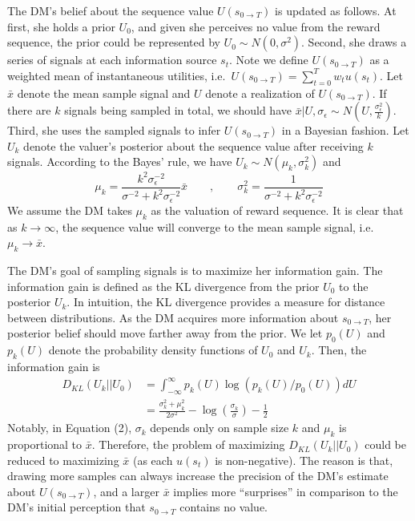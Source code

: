 \documentclass[
  12pt,
]{article}
\begin{document}
The DM's belief about the sequence value \(U(s_{0\rightarrow T})\) is
updated as follows. At first, she holds a prior \(U_0\), and given she
perceives no value from the reward sequence, the prior could be
represented by \(U_0 \sim N(0, \sigma^2)\). Second, she draws a series
of signals at each information source \(s_t\). Note we define
\(U(s_{0\rightarrow T})\) as a weighted mean of instantaneous utilities,
i.e.~\(U(s_{0\rightarrow T})=\sum_{t=0}^Tw_tu(s_t)\). Let \(\bar{x}\)
denote the mean sample signal and \(U\) denote a realization of
\(U(s_{0\rightarrow T})\). If there are \(k\) signals being sampled in
total, we should have
\(\bar{x} | U, \sigma_\epsilon\sim N(U,\frac{\sigma_{\epsilon}^2}{k})\).
Third, she uses the sampled signals to infer \(U(s_{0\rightarrow T})\)
in a Bayesian fashion. Let \(U_k\) denote the valuer's posterior about
the sequence value after receiving \(k\) signals. According to the
Bayes' rule, we have \(U_k\sim N(\mu_k,\sigma_k^2)\) and\[
\mu_k = \frac{k^2\sigma_\epsilon^{-2}}{\sigma^{-2}+k^2\sigma_\epsilon^{-2}}\bar{x}\qquad,\qquad 
\sigma_k^2 =  \frac{1}{\sigma^{-2}+k^2\sigma_\epsilon^{-2}}
\]We assume the DM takes \(\mu_k\) as the valuation of reward sequence.
It is clear that as \(k\rightarrow \infty\), the sequence value will
converge to the mean sample signal, i.e.~\(\mu_k \rightarrow \bar{x}\).

The DM's goal of sampling signals is to maximize her information gain.
The information gain is defined as the KL divergence from the prior
\(U_0\) to the posterior \(U_k\). In intuition, the KL divergence
provides a measure for distance between distributions. As the DM
acquires more information about \(s_{0\rightarrow T}\), her posterior
belief should move farther away from the prior. We let \(p_0(U)\) and
\(p_k(U)\) denote the probability density functions of \(U_0\) and
\(U_k\). Then, the information gain is\[\tag{2}
\begin{aligned}
D_{KL}(U_k||U_0)&=\int_{-\infty}^{\infty} p_k(U) \log\left(p_k(U)/p_0(U)\right)dU \\
&=\frac{\sigma_k^2+\mu_k^2}{2\sigma^2} - \log\left(\frac{\sigma_k}{\sigma}\right)-\frac{1}{2}
\end{aligned}
\]Notably, in Equation (2), \(\sigma_k\) depends only on sample size
\(k\) and \(\mu_k\) is proportional to \(\bar{x}\). Therefore, the
problem of maximizing \(D_{KL}(U_k||U_0)\) could be reduced to
maximizing \(\bar{x}\) (as each \(u(s_t)\) is non-negative). The reason
is that, drawing more samples can always increase the precision of the
DM's estimate about \(U(s_{0\rightarrow T})\), and a larger \(\bar{x}\)
implies more ``surprises'' in comparison to the DM's initial perception
that \(s_{0\rightarrow T}\) contains no value.
\end{document}

